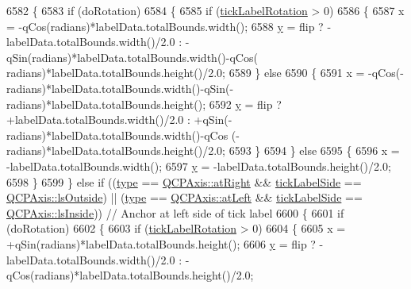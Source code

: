 \begin{DoxyCode}
6582   \{
6583     \textcolor{keywordflow}{if} (doRotation)
6584     \{
6585       \textcolor{keywordflow}{if} (\hyperlink{class_q_c_p_axis_painter_private_ae6ade9232a8e400924009e8edca94bac}{tickLabelRotation} > 0)
6586       \{
6587         x = -qCos(radians)*labelData.totalBounds.width();
6588         \hyperlink{_comparision_pictures_2_createtest_image_8m_a2fb1c5cf58867b5bbc9a1b145a86f3a0}{y} = flip ? -labelData.totalBounds.width()/2.0 : -qSin(radians)*labelData.totalBounds.width()-qCos(
      radians)*labelData.totalBounds.height()/2.0;
6589       \} \textcolor{keywordflow}{else}
6590       \{
6591         x = -qCos(-radians)*labelData.totalBounds.width()-qSin(-radians)*labelData.totalBounds.height();
6592         \hyperlink{_comparision_pictures_2_createtest_image_8m_a2fb1c5cf58867b5bbc9a1b145a86f3a0}{y} = flip ? +labelData.totalBounds.width()/2.0 : +qSin(-radians)*labelData.totalBounds.width()-qCos
      (-radians)*labelData.totalBounds.height()/2.0;
6593       \}
6594     \} \textcolor{keywordflow}{else}
6595     \{
6596       x = -labelData.totalBounds.width();
6597       \hyperlink{_comparision_pictures_2_createtest_image_8m_a2fb1c5cf58867b5bbc9a1b145a86f3a0}{y} = -labelData.totalBounds.height()/2.0;
6598     \}
6599   \} \textcolor{keywordflow}{else} \textcolor{keywordflow}{if} ((\hyperlink{class_q_c_p_axis_painter_private_ae04594e97417336933d807c86d353098}{type} == \hyperlink{class_q_c_p_axis_ae2bcc1728b382f10f064612b368bc18aadf5509f7d29199ef2f263b1dd224b345}{QCPAxis::atRight} && \hyperlink{class_q_c_p_axis_painter_private_a9d27f7625fcfbeb3a60193d0c18fc7e9}{tickLabelSide} == 
      \hyperlink{class_q_c_p_axis_a24b13374b9b8f75f47eed2ea78c37db9a2eadb509fc0c9a8b35b85c86ec9f3c7a}{QCPAxis::lsOutside}) || (\hyperlink{class_q_c_p_axis_painter_private_ae04594e97417336933d807c86d353098}{type} == \hyperlink{class_q_c_p_axis_ae2bcc1728b382f10f064612b368bc18aaf84aa6cac6fb6099f54a2cbf7546b730}{QCPAxis::atLeft} && 
      \hyperlink{class_q_c_p_axis_painter_private_a9d27f7625fcfbeb3a60193d0c18fc7e9}{tickLabelSide} == \hyperlink{class_q_c_p_axis_a24b13374b9b8f75f47eed2ea78c37db9aae7b027ac2839cf4ad611df30236fc3f}{QCPAxis::lsInside})) \textcolor{comment}{// Anchor at left side of tick label}
6600   \{
6601     \textcolor{keywordflow}{if} (doRotation)
6602     \{
6603       \textcolor{keywordflow}{if} (\hyperlink{class_q_c_p_axis_painter_private_ae6ade9232a8e400924009e8edca94bac}{tickLabelRotation} > 0)
6604       \{
6605         x = +qSin(radians)*labelData.totalBounds.height();
6606         \hyperlink{_comparision_pictures_2_createtest_image_8m_a2fb1c5cf58867b5bbc9a1b145a86f3a0}{y} = flip ? -labelData.totalBounds.width()/2.0 : -qCos(radians)*labelData.totalBounds.height()/2.0;

\end{DoxyCode}

